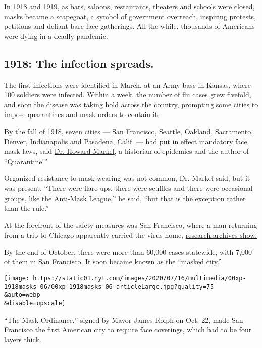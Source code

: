 In 1918 and 1919, as bars, saloons, restaurants, theaters and schools
were closed, masks became a scapegoat, a symbol of government overreach,
inspiring protests, petitions and defiant bare-face gatherings. All the
while, thousands of Americans were dying in a deadly pandemic.

\hypertarget{1918-the-infection-spreads}{%
\subsection{1918: The infection
spreads.}\label{1918-the-infection-spreads}}

The first infections were identified in March, at an Army base in
Kansas, where 100 soldiers were infected. Within a week, the
\href{https://www.cdc.gov/flu/pandemic-resources/1918-commemoration/pandemic-timeline-1918.htm}{number
of flu cases grew fivefold,} and soon the disease was taking hold across
the country, prompting some cities to impose quarantines and mask orders
to contain it.

By the fall of 1918, seven cities --- San Francisco, Seattle, Oakland,
Sacramento, Denver, Indianapolis and Pasadena, Calif. --- had put in
effect mandatory face mask laws, said
\href{http://chm.med.umich.edu/about/howard-markel-m-d-ph-d/}{Dr. Howard
Markel}, a historian of epidemics and the author of
``\href{https://jhupbooks.press.jhu.edu/title/quarantine}{Quarantine!}''

Organized resistance to mask wearing was not common, Dr. Markel said,
but it was present. ``There were flare-ups, there were scuffles and
there were occasional groups, like the Anti-Mask League,'' he said,
``but that is the exception rather than the rule.''

At the forefront of the safety measures was San Francisco, where a man
returning from a trip to Chicago apparently carried the virus home,
\href{http://www.influenzaarchive.org/cities/city-sanfrancisco.html}{research
archives show.}

By the end of October, there were more than 60,000 cases statewide, with
7,000 of them in San Francisco. It soon became known as the ``masked
city.''

\texttt{[image: https://static01.nyt.com/images/2020/07/16/multimedia/00xp-1918masks-06/00xp-1918masks-06-articleLarge.jpg?quality=75\\\&auto=webp\\\&disable=upscale]}

``The Mask Ordinance,'' signed by Mayor James Rolph on Oct. 22, made San
Francisco the first American city to require face coverings, which had
to be four layers thick.

